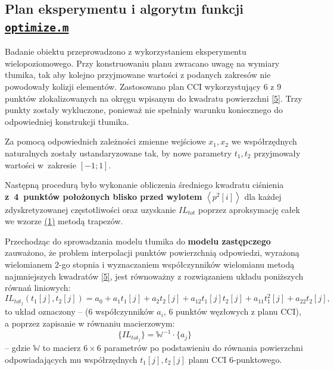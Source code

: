 \documentclass{sprawozdanie-agh}
\begin{document}
\subsection{Plan eksperymentu i algorytm funkcji \texttt{\hyperref[list6]{optimize.m}}}
\par Badanie obiektu przeprowadzono z wykorzystaniem eksperymentu wielopoziomowego. Przy konstruowaniu planu zwracano uwagę na wymiary tłumika, tak aby kolejno przyjmowane wartości z podanych zakresów nie powodowały kolizji elementów. Zastosowano plan CCI wykorzystujący 6 z 9 punktów zlokalizowanych na okręgu wpisanym do kwadratu powierzchni \hyperref[ref5]{[5]}. Trzy punkty zostały wykluczone, ponieważ nie spełniały warunku koniecznego do odpowiedniej konstrukcji tłumika.
\par Za pomocą odpowiednich zależności zmienne wejściowe $x_1,x_2$ we współrzędnych naturalnych zostały ustandaryzowane tak, by nowe parametry $t_1,t_2$ przyjmowały wartości w~zakresie $[-1;1]$.
\par Następną procedurą było wykonanie obliczenia średniego kwadratu ciśnienia \textbf{z~4~punktów położonych blisko przed wylotem} $\left \langle p^2[i]\right\rangle$ dla każdej zdyskretyzowanej częstotliwości oraz uzyskanie $IL_{tot}$ poprzez aproksymację całek we wzorze \hyperref[eq]{(1)} metodą trapezów.
\par Przechodząc do sprowadzania modelu tłumika do \textbf{modelu zastępczego} zauważono, że problem interpolacji punktów powierzchnią odpowiedzi, wyrażoną wielomianem 2-go stopnia i wyznaczaniem współczynników wielomianu metodą najmniejszych kwadratów \hyperref[ref5]{[5]}, jest równoważny z rozwiązaniem układu poniższych równań liniowych:
\[IL_{tot_{j}}(t_{1}[j],t_{2}[j])=a_0+a_1 t_{1}[j]+a_2 t_{2}[j]+a_{12}t_{1}[j] t_{2}[j]+a_{11}t_{1}^2[j]+a_{22}t_{2}[j],\]
to układ oznaczony -- (6 współczynników $a_i$, 6 punktów węzłowych z planu CCI), a poprzez zapisanie w równaniu macierzowym:
\begin{equation}
    \{IL_{tot_{j}}\}=\mathbb{W}^{-1}\cdot\{a_j\}
\end{equation}
-- gdzie $\mathbb{W}$ to macierz $6\times6$ parametrów po podstawieniu do równania powierzchni odpowiadających mu współrzędnych $t_1[j],t_2[j]$ planu CCI 6-punktowego.
\end{document}
